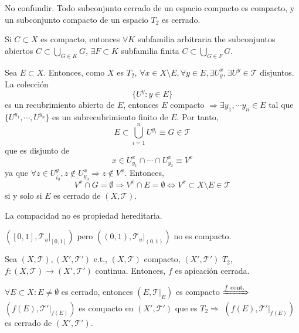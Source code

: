 
\begin{obs}
  No confundir. Todo subconjunto cerrado de un espacio compacto es compacto, y un subconjunto compacto de un espacio $T_{2}$ es cerrado.
\end{obs}

\begin{obs}
  Si $C \subset X$ es compacto, entonces $\forall K$ subfamilia arbitraria the subconjuntos abiertos $C \subset \bigcup_{G \in K} G$, $\exists F \subset K$ subfamilia finita $C \subset \bigcup_{G \in F} G$.
\end{obs}

\begin{dem}
  Sea $E \subset X$. Entonces, como $X$ es $T_{2}$, $\forall x \in X \setminus E, \forall y \in E, \exists U^{x}_{y}, \exists U^{y} \in \mathcal{T}$ disjuntos. La colección
  \[
    \{ U^{y} : y \in E \}
  \]
  es un recubrimiento abierto de $E$, entonces $E$ compacto $\Rightarrow \exists y_{1}, \cdots y_{n} \in E$ tal que $\{ U^{y_{1}} , \cdots, U^{y_{n}} \}$ es un subrecubrimiento finito de $E$. Por tanto,
  \[ 
    E \subset \bigcup_{i = 1}^{n} U^{y_{i}} \equiv G \in \mathcal{T}
  \] 
  que es disjunto de
  \[ 
    x \in U^{x}_{y_{1}} \cap \cdots \cap U^{x}_{y_{2}} \equiv V^{x}
  \] 
  ya que $\forall z \in U^{y}_{i_{0}}, z \not \in U^{x}_{y_{0}} \Rightarrow z \not \in V^{x}$. Entonces, 
  \[ 
    V^{x} \cap G = \emptyset \Rightarrow V^{x} \cap E = \emptyset \Leftrightarrow V^{x} \subset X \setminus E \in \mathcal{T}
  \] 
  si y solo si $E$ es cerrado de $( X, \mathcal{T} )$.
\end{dem}

\begin{obs}
  La compacidad no es propiedad hereditaria.
\end{obs}

\begin{ejm}
  $( [0, 1], \mathcal{T}_{u}|_{[0,1]} )$ pero $( (0,1), \mathcal{T}_{u}|_{(0,1)} )$ no es compacto.
\end{ejm}

\begin{prop}
  Sea $( X, \mathcal{T} ), ( X', \mathcal{T}' )$ e.t., $( X, \mathcal{T} )$ compacto, $( X', \mathcal{T}' )$ $T_{2}$, $f : ( X, \mathcal{T} ) \to ( X', \mathcal{T}' )$ continua. Entonces, $f$ es apicación cerrada.
\end{prop}

\begin{dem}
  $\forall E \subset X : E \neq \emptyset$ es cerrado, entonces $( E, \mathcal{T}|_{E})$ es compacto $\xRightarrow[]{ f \text{ cont.} }$ $( f(E), \mathcal{T}'|_{f(E)})$ es compacto en $( X', \mathcal{T}' )$ que es $T_{2} \Rightarrow$ $( f(E), \mathcal{T}'|_{f(E)})$ es cerrado de $( X', \mathcal{T}' )$.
\end{dem}

